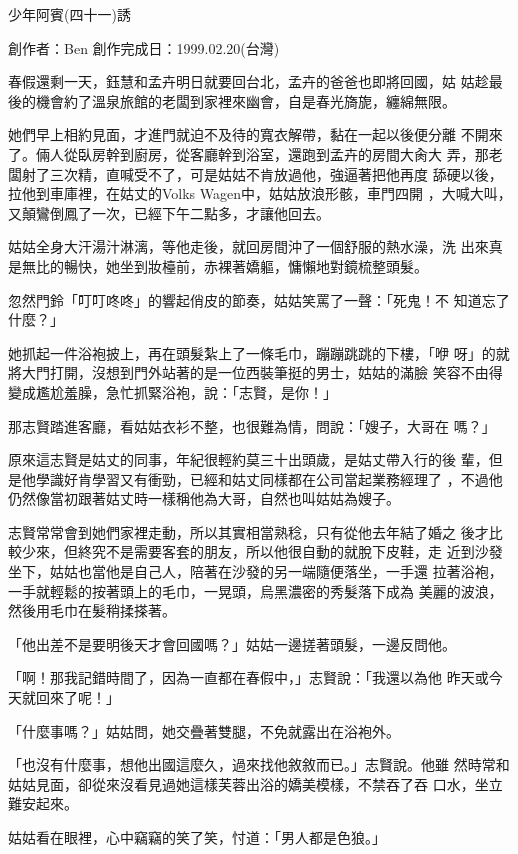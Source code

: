 



少年阿賓(四十一)誘

創作者：Ben
創作完成日：1999.02.20(台灣)


春假還剩一天，鈺慧和孟卉明日就要回台北，孟卉的爸爸也即將回國，姑
姑趁最後的機會約了溫泉旅館的老闆到家裡來幽會，自是春光旖旎，纏綿無限。

她們早上相約見面，才進門就迫不及待的寬衣解帶，黏在一起以後便分離
不開來了。倆人從臥房幹到廚房，從客廳幹到浴室，還跑到孟卉的房間大肏大
弄，那老闆射了三次精，直喊受不了，可是姑姑不肯放過他，強逼著把他再度
舔硬以後，拉他到車庫裡，在姑丈的Volks Wagen中，姑姑放浪形骸，車門四開
，大喊大叫，又顛鸞倒鳳了一次，已經下午二點多，才讓他回去。

姑姑全身大汗湯汁淋漓，等他走後，就回房間沖了一個舒服的熱水澡，洗
出來真是無比的暢快，她坐到妝檯前，赤裸著嬌軀，慵懶地對鏡梳整頭髮。

忽然門鈴「叮叮咚咚」的響起俏皮的節奏，姑姑笑罵了一聲：「死鬼！不
知道忘了什麼？」

她抓起一件浴袍披上，再在頭髮紮上了一條毛巾，蹦蹦跳跳的下樓，「咿
呀」的就將大門打開，沒想到門外站著的是一位西裝筆挺的男士，姑姑的滿臉
笑容不由得變成尷尬羞臊，急忙抓緊浴袍，說：「志賢，是你！」

那志賢踏進客廳，看姑姑衣衫不整，也很難為情，問說：「嫂子，大哥在
嗎？」

原來這志賢是姑丈的同事，年紀很輕約莫三十出頭歲，是姑丈帶入行的後
輩，但是他學識好肯學習又有衝勁，已經和姑丈同樣都在公司當起業務經理了
，不過他仍然像當初跟著姑丈時一樣稱他為大哥，自然也叫姑姑為嫂子。

志賢常常會到她們家裡走動，所以其實相當熟稔，只有從他去年結了婚之
後才比較少來，但終究不是需要客套的朋友，所以他很自動的就脫下皮鞋，走
近到沙發坐下，姑姑也當他是自己人，陪著在沙發的另一端隨便落坐，一手還
拉著浴袍，一手就輕鬆的按著頭上的毛巾，一晃頭，烏黑濃密的秀髮落下成為
美麗的波浪，然後用毛巾在髮稍揉搽著。

「他出差不是要明後天才會回國嗎？」姑姑一邊搓著頭髮，一邊反問他。

「啊！那我記錯時間了，因為一直都在春假中，」志賢說：「我還以為他
昨天或今天就回來了呢！」

「什麼事嗎？」姑姑問，她交疊著雙腿，不免就露出在浴袍外。

「也沒有什麼事，想他出國這麼久，過來找他敘敘而已。」志賢說。他雖
然時常和姑姑見面，卻從來沒看見過她這樣芙蓉出浴的嬌美模樣，不禁吞了吞
口水，坐立難安起來。

姑姑看在眼裡，心中竊竊的笑了笑，忖道：「男人都是色狼。」

